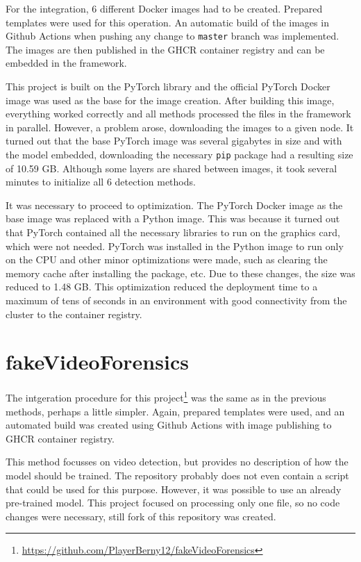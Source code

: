 For the integration, 6 different Docker images had to be created. Prepared templates were used for this operation. An automatic build of the images in Github Actions when pushing any change to \texttt{master} branch was implemented. The images are then published in the GHCR container registry and can be embedded in the framework.

This project is built on the PyTorch library and the official PyTorch Docker image was used as the base for the image creation. After building this image, everything worked correctly and all methods processed the files in the framework in parallel. However, a problem arose, downloading the images to a given node. It turned out that the base PyTorch image was several gigabytes in size and with the model embedded, downloading the necessary \texttt{pip} package had a resulting size of 10.59 GB. Although some layers are shared between images, it took several minutes to initialize all 6 detection methods.

It was necessary to proceed to optimization. The PyTorch Docker image as the base image was replaced with a Python image. This was because it turned out that PyTorch contained all the necessary libraries to run on the graphics card, which were not needed. PyTorch was installed in the Python image to run only on the CPU and other minor optimizations were made, such as clearing the memory cache after installing the package, etc. Due to these changes, the size was reduced to 1.48 GB. This optimization reduced the deployment time to a maximum of tens of seconds in an environment with good connectivity from the cluster to the container registry.

\section{fakeVideoForensics}

The intgeration procedure for this project\footnote{\url{https://github.com/PlayerBerny12/fakeVideoForensics}} was the same as in the previous methods, perhaps a little simpler. Again, prepared templates were used, and an automated build was created using Github Actions with image publishing to GHCR container registry.

This method focusses on video detection, but provides no description of how the model should be trained. The repository probably does not even contain a script that could be used for this purpose. However, it was possible to use an already pre-trained model. This project focused on processing only one file, so no code changes were necessary, still fork of this repository was created.

